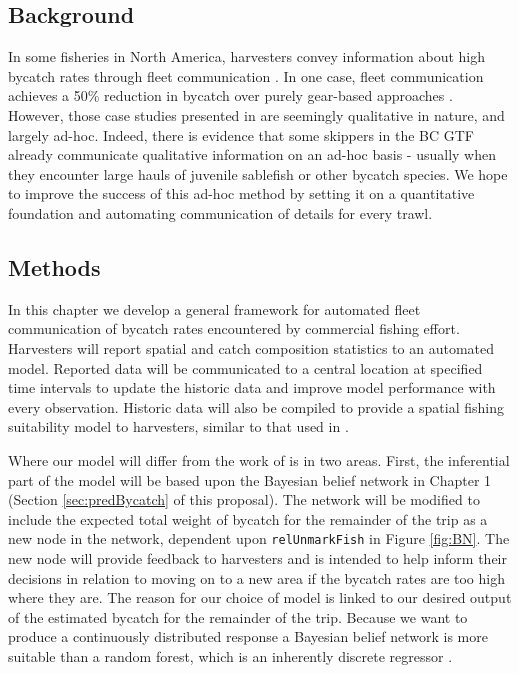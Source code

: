 \documentclass{article}
\begin{document}
\subsection{Background}
In some fisheries in North America, harvesters convey information about high bycatch rates through fleet communication \citep{gilman2006fleet,hall2005managing}. In one case, fleet communication achieves a 50\% reduction in bycatch over purely gear-based approaches \citep{gilman2006fleet}. However, those case studies presented in \citet{gilman2006fleet} are seemingly qualitative in nature, and largely ad-hoc. Indeed, there is evidence that some skippers in the BC GTF already communicate qualitative information on an ad-hoc basis - usually when they encounter large hauls of juvenile sablefish or other bycatch species. We hope to improve the success of this ad-hoc method by setting it on a quantitative foundation and automating communication of details for every trawl.

\subsection{Methods}

In this chapter we develop a general framework for automated fleet communication of bycatch rates encountered by commercial fishing effort. Harvesters will report spatial and catch composition statistics to an automated model. Reported data will be communicated to a central location at specified time intervals to update the historic data and improve model performance with every observation. Historic data will also be compiled to provide a spatial fishing suitability model to harvesters, similar to that used in \cite{vilela2015fishing}.

Where our model will differ from the work of \citet{vilela2015fishing} is in two areas. First, the inferential part of the model will be based upon the Bayesian belief network in Chapter 1 (Section \ref{sec:predBycatch} of this proposal). The network will be modified to include the expected total weight of bycatch for the remainder of the trip as a new node in the network, dependent upon \verb+relUnmarkFish+ in Figure \ref{fig:BN}. The new node will provide feedback to harvesters and is intended to help inform their decisions in relation to moving on to a new area if the bycatch rates are too high where they are. The reason for our choice of model is linked to our desired output of the estimated bycatch for the remainder of the trip. Because we want to produce a continuously distributed response a Bayesian belief network is more suitable than a random forest, which is an inherently discrete regressor \citep{breiman2001random}.
\end{document}

